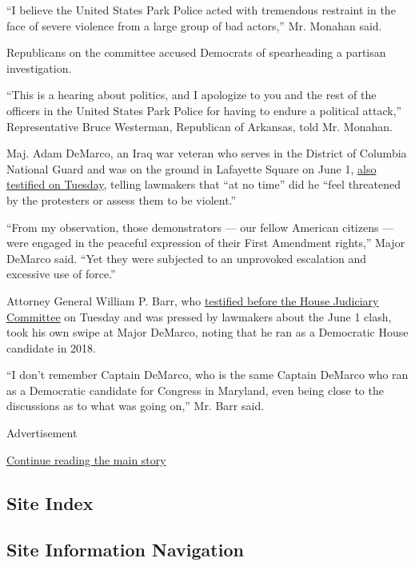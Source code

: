 ``I believe the United States Park Police acted with tremendous
restraint in the face of severe violence from a large group of bad
actors,'' Mr. Monahan said.

Republicans on the committee accused Democrats of spearheading a
partisan investigation.

``This is a hearing about politics, and I apologize to you and the rest
of the officers in the United States Park Police for having to endure a
political attack,'' Representative Bruce Westerman, Republican of
Arkansas, told Mr. Monahan.

Maj. Adam DeMarco, an Iraq war veteran who serves in the District of
Columbia National Guard and was on the ground in Lafayette Square on
June 1,
\href{https://naturalresources.house.gov/imo/media/doc/Mr.\%20Adam\%20DeMarco\%20-\%20Written\%20Testimony_.pdf}{also
testified on Tuesday}, telling lawmakers that ``at no time'' did he
``feel threatened by the protesters or assess them to be violent.''

``From my observation, those demonstrators --- our fellow American
citizens --- were engaged in the peaceful expression of their First
Amendment rights,'' Major DeMarco said. ``Yet they were subjected to an
unprovoked escalation and excessive use of force.''

Attorney General William P. Barr, who
\href{https://www.nytimes.com/2020/07/28/us/politics/william-barr-house-judiciary-hearing.html}{testified
before the House Judiciary Committee} on Tuesday and was pressed by
lawmakers about the June 1 clash, took his own swipe at Major DeMarco,
noting that he ran as a Democratic House candidate in 2018.

``I don't remember Captain DeMarco, who is the same Captain DeMarco who
ran as a Democratic candidate for Congress in Maryland, even being close
to the discussions as to what was going on,'' Mr. Barr said.

Advertisement

\protect\hyperlink{after-bottom}{Continue reading the main story}

\hypertarget{site-index}{%
\subsection{Site Index}\label{site-index}}

\hypertarget{site-information-navigation}{%
\subsection{Site Information
Navigation}\label{site-information-navigation}}

